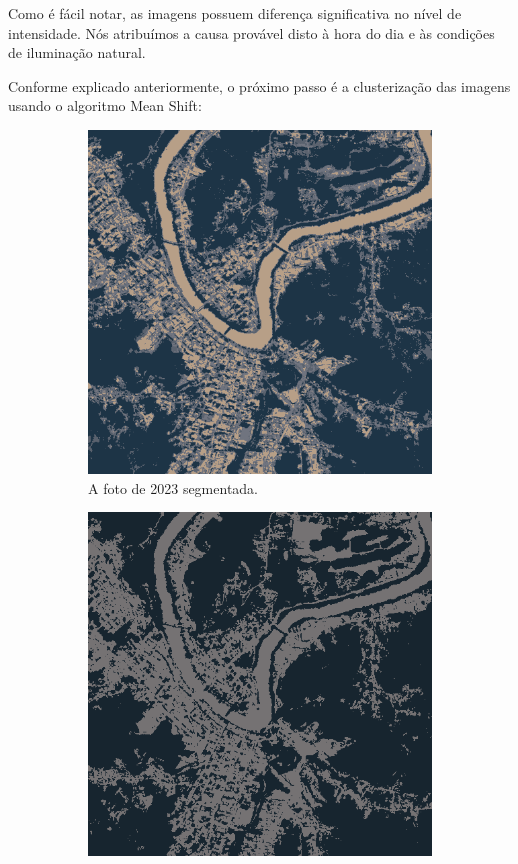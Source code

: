 \documentclass{article}
\begin{document}
Como é fácil notar, as imagens possuem diferença significativa no nível de intensidade. Nós atribuímos a causa provável disto à hora do dia e às condições de iluminação natural.

Conforme explicado anteriormente, o próximo passo é a clusterização das imagens usando o algoritmo Mean Shift:

\begin{figure}[H]
    \centering
    \begin{subfigure}[b]{0.48\textwidth}
        \includegraphics[width=\textwidth]{../Imagens/012023_mean_shift.png}
        \caption{A foto de 2023 segmentada.}
        \label{2023}
    \end{subfigure}
    \hfill %
    \begin{subfigure}[b]{0.48\textwidth}
        \includegraphics[width=\textwidth]{../Imagens/012025_mean_shift.png}

\end{subfigure}
\end{figure}
\end{document}
